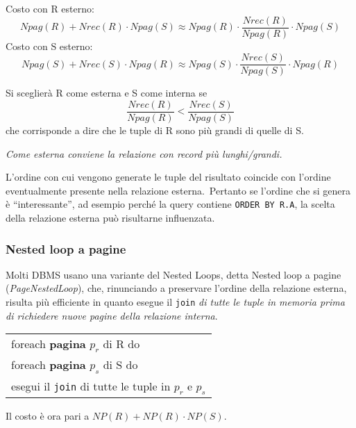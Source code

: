 \begin{flushleft}
	Costo con R esterno: \[Npag(R) + Nrec(R) \cdot Npag(S) \approx Npag(R)\cdot\frac{Nrec(R)}{Npag(R)}\cdot Npag(S)\]
	Costo con S esterno: \[Npag(S) + Nrec(S) \cdot Npag(R) \approx Npag(S)\cdot\frac{Nrec(S)}{Npag(S)}\cdot Npag(R)\]
\end{flushleft}

\noindent Si sceglierà R come esterna e S come interna se \[\frac{Nrec(R)}{Npag(R)} < \frac{Nrec(S)}{Npag(S)}\] che corrisponde a dire che le tuple di R sono più grandi di quelle di S.\

\begin{center}
	\textit{Come esterna conviene la relazione con record più lunghi/grandi.}
\end{center}

\noindent L'ordine con cui vengono generate le tuple del risultato coincide con l'ordine eventualmente presente nella relazione esterna.\
Pertanto se l'ordine che si genera è ``interessante'', ad esempio perché la query contiene \texttt{ORDER BY R.A}, la scelta della relazione esterna può risultarne influenzata.\

\subsubsection{Nested loop a pagine}

Molti DBMS usano una variante del Nested Loops, detta Nested loop a pagine (\textit{PageNestedLoop}), che, rinunciando a preservare l'ordine della relazione esterna, risulta più efficiente in quanto esegue il \texttt{join} \textit{di tutte le tuple in memoria prima di richiedere nuove pagine della relazione interna}.\

\begin{table}[H]
	\centering
	\begin{tabular}{|l|}
		\hline
		foreach \textbf{pagina} $p_r$ di R do                             \\
		\quad foreach \textbf{pagina} $p_s$ di S do                       \\
		\qquad esegui il \texttt{join} di tutte le tuple in $p_r$ e $p_s$ \\\hline
	\end{tabular}
\end{table}

\begin{flushleft}
	Il costo è ora pari a $\mathit{NP}(R) + \mathit{NP}(R) \cdot \mathit{NP}(S)$.
\end{flushleft}

